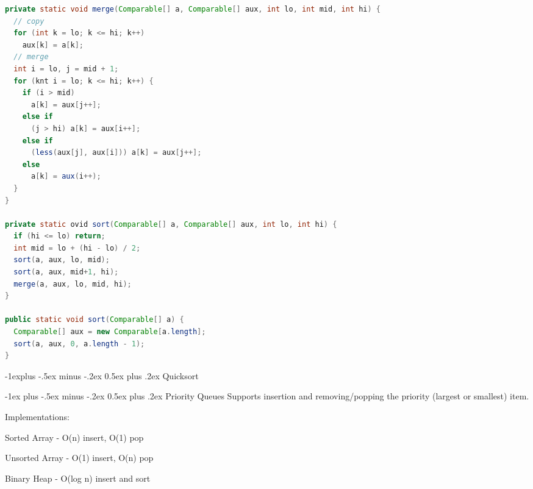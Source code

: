 \documentclass[letterpaper, 8pt]{extarticle}
\makeatletter
\renewcommand{\section}{\@startsection{section}{1}{0mm}%
                                {-1ex plus -.5ex minus -.2ex}%
                                {0.5ex plus .2ex}%
                                {\normalfont\normalsize\bfseries}}
\renewcommand{\subsection}{\@startsection{subsection}{2}{0mm}%
                                {-1explus -.5ex minus -.2ex}%
                                {0.5ex plus .2ex}%
                                {\normalfont\small\bfseries}}
\makeatother
\begin{document}
\begin{multicols*}{5}
    \begin{lstlisting}[language=Java, breaklines=true, postbreak=\mbox{\textcolor{red}{$\hookrightarrow$}\space}]
private static void merge(Comparable[] a, Comparable[] aux, int lo, int mid, int hi) {
  // copy
  for (int k = lo; k <= hi; k++)
    aux[k] = a[k];
  // merge
  int i = lo, j = mid + 1;
  for (knt i = lo; k <= hi; k++) {
    if (i > mid) 
      a[k] = aux[j++];
    else if
      (j > hi) a[k] = aux[i++];
    else if
      (less(aux[j], aux[i])) a[k] = aux[j++];
    else
      a[k] = aux(i++);
  }
}

private static ovid sort(Comparable[] a, Comparable[] aux, int lo, int hi) {
  if (hi <= lo) return;
  int mid = lo + (hi - lo) / 2;
  sort(a, aux, lo, mid);
  sort(a, aux, mid+1, hi);
  merge(a, aux, lo, mid, hi);
}

public static void sort(Comparable[] a) {
  Comparable[] aux = new Comparable[a.length];
  sort(a, aux, 0, a.length - 1);
}
    \end{lstlisting}

    \subsection{Quicksort}

    \section{Priority Queues}
    Supports insertion and removing/popping the priority (largest or smallest) item.

    Implementations:
    \begin{list}{}{}
        \item Sorted Array - O(n) insert, O(1) pop
        \item Unsorted Array - O(1) insert, O(n) pop
        \item Binary Heap - O(log n) insert and sort
    \end{list}


\end{multicols*}
\end{document}
